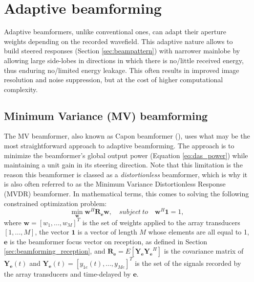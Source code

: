 
\section{Adaptive beamforming}
\label{sec:adaptive_beamforming}
Adaptive beamformers, unlike conventional ones, can adapt their aperture weights depending on the recorded wavefield. This adaptive nature allows to build steered responses (Section \ref{sec:beampattern}) with narrower mainlobe by allowing large side-lobes in directions in which there is no/little received energy, thus enduring no/limited energy leakage. This often results in improved image resolution and noise suppression, but at the cost of higher computational complexity.

\subsection{Minimum Variance (MV) beamforming}
\label{sec:MV}
The MV beamformer, also known as Capon beamformer (\cite{Capon}), uses what may be the most straightforward approach to adaptive beamforming. The approach is to minimize the beamformer's global output power (Equation \ref{eq:das_power}) while maintaining a unit gain in its steering direction. Note that this limitation is the reason this beamformer is classed as a \textit{distortionless} beamformer, which is why it is also often referred to as the Minimum Variance Distortionless Response (MVDR) beamformer. In mathematical terms, this comes to solving the following constrained optimization problem:
\begin{equation}
    \min_{\boldsymbol{w}} \boldsymbol{w}^H \boldsymbol{R_e} \boldsymbol{w}, \quad subject ~ to \quad \boldsymbol{w}^H \boldsymbol{1} = 1,
\label{eq:mv_problem}
\end{equation}
\noindent
where $\boldsymbol{w} = [w_1, ..., w_M]^T$ is the set of weights applied to the array transducers $[1,...,M]$, the vector $\boldsymbol{1}$ is a vector of length $M$ whose elements are all equal to 1, $\boldsymbol{e}$ is the beamformer focus vector on reception, as defined in Section \ref{sec:beamforming_reception}, and $\boldsymbol{R_e} = E[\boldsymbol{Y_e} \boldsymbol{Y_e}^H]$ is the covariance matrix of $\boldsymbol{Y_e}(t)$ and $\boldsymbol{Y_e}(t) = [y_{1e}(t), ..., y_{Me}]^T$ is the set of the signals recorded by the array transducers and time-delayed by $\boldsymbol{e}$.

